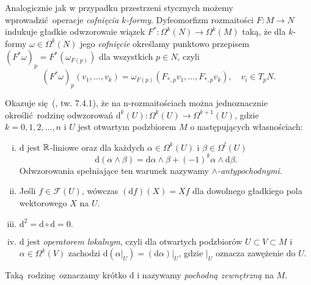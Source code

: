 


Analogicznie jak w przypadku przestrzeni stycznych możemy wprowadzić operacje \emph{cofnięcia \(k\)-formy}. Dyfeomorfizm rozmaitości \(F:M\to N\) indukuje gładkie odwzorowaie wiązek \(F^\ast:\Omega^k(N)\to\Omega^{k}(M)\) taką, że dla \(k\)-formy \(\omega\in\Omega^k(N)\) jego \emph{cofnięcie} określamy punktowo przepisem \((F^\ast \omega)_p = F^\ast(\omega_{F(p)})\) dla wszystkich \(p\in N\), czyli
\begin{equation*}
    (F^\ast\omega)_p(v_1, \dots, v_k) = \omega_{F(p)}(F_{\ast,p}v_1, \dots, F_{\ast,p}v_k),\quad v_i\in T_p N.
\end{equation*}

Okazuje się (\cite{marsden}, tw. 7.4.1), że na n-rozmaitościach można jednoznacznie określić rodzinę odwzorowań \(\mathrm{d}^k(U): \Omega^k(U)\to \Omega^{k+1}(U)\), gdzie \(k=0, 1, 2, \dots, n\) i \(U\) jest otwartym podzbiorem \(M\) o następujących własnościach:
\begin{enumerate}[i)]
    \item \(\mathrm{d}\) jest \(\mathbb{R}\)-liniowe oraz dla każdych \(\alpha\in \Omega^k(U)\) i \(\beta\in \Omega^l(U)\)
        \begin{equation*}
            \mathrm{d}(\alpha \wedge \beta) = \mathrm{d}\alpha \wedge \beta + (-1)^k \alpha \wedge \mathrm{d}\beta.
        \end{equation*}
        Odwzorowania spełniające ten warunek nazywamy \emph{\(\wedge\)-antypochodnymi}.
    \item Jeśli \(f\in\mathcal{F}(U)\), wówczas \((\mathrm{d}f)(X)=Xf\) dla dowolnego gładkiego pola wektorowego \(X\) na \(U\).
    \item \(\mathrm{d^2} = \mathrm{d} \circ \mathrm{d} = 0.\)
    \item \(\mathrm{d}\) jest \emph{operatorem lokalnym}, czyli dla otwartych podzbiorów \(U \subset V \subset M\) i \(\alpha\in\Omega^k(V)\) zachodzi \(\mathrm{d}(\left.\alpha\right|_U)  = \left.(\mathrm{d}\alpha)\right|_U\), gdzie \(|_U\) oznacza zawężenie do \(U\).
\end{enumerate}
Taką rodzinę oznaczamy krótko \(\mathrm{d}\) i nazywamy \emph{pochodną zewnętrzną} na \(M\).


